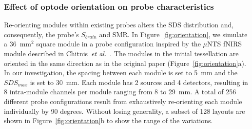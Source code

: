 \subsubsection{Effect of optode orientation on probe characteristics}
Re-orienting modules within existing probes alters the \ac{SDS} distribution and, consequently, the probe's $S_{brain}$ and \ac{SMR}. In Figure~\ref{fig:orientation}, we simulate a 36~$\textrm{mm}^2$ square module in a probe configuration inspired by the $\mu$NTS \ac{fNIRS} module described in Chitnis~\emph{et al.}~\cite{Chitnis2016}. The modules in the initial tessellation are oriented in the same direction as in the original paper (Figure~\ref{fig:orientation}a). In our investigation, the spacing between each module is set to 5~mm and the $SDS_{max}$ is set to 30~mm. Each module has 2 sources and 4 detectors, resulting in 8 intra-module channels per module ranging from 8 to 29~mm. A total of 256 different probe configurations result from exhaustively re-orienting each module individually by 90 degrees. Without losing generality, a subset of 128 layouts are shown in Figure~\ref{fig:orientation}b to show the range of the variations.

